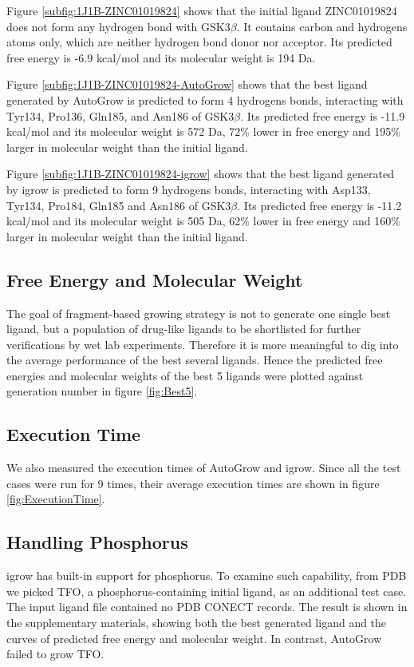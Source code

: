 \documentclass[10pt, conference, compsocconf]{IEEEtran}
\begin{document}
Figure \ref{subfig:1J1B-ZINC01019824} shows that the initial ligand ZINC01019824 does not form any hydrogen bond with GSK3$\beta$. It contains carbon and hydrogens atoms only, which are neither hydrogen bond donor nor acceptor. Its predicted free energy is -6.9 kcal/mol and its molecular weight is 194 Da.

Figure \ref{subfig:1J1B-ZINC01019824-AutoGrow} shows that the best ligand generated by AutoGrow is predicted to form 4 hydrogens bonds, interacting with Tyr134, Pro136, Gln185, and Asn186 of GSK3$\beta$. Its predicted free energy is -11.9 kcal/mol and its molecular weight is 572 Da, 72\% lower in free energy and 195\% larger in molecular weight than the initial ligand.

Figure \ref{subfig:1J1B-ZINC01019824-igrow} shows that the best ligand generated by igrow is predicted to form 9 hydrogens bonds, interacting with Asp133, Tyr134, Pro184, Gln185 and Asn186 of GSK3$\beta$. Its predicted free energy is -11.2 kcal/mol and its molecular weight is 505 Da, 62\% lower in free energy and 160\% larger in molecular weight than the initial ligand.

\subsection{Free Energy and Molecular Weight}

The goal of fragment-based growing strategy is not to generate one single best ligand, but a population of drug-like ligands to be shortlisted for further verifications by wet lab experiments. Therefore it is more meaningful to dig into the average performance of the best several ligands. Hence the predicted free energies and molecular weights of the best 5 ligands were plotted against generation number in figure \ref{fig:Best5}.

\subsection{Execution Time}

We also measured the execution times of AutoGrow and igrow. Since all the test cases were run for 9 times, their average execution times are shown in figure \ref{fig:ExecutionTime}.

\subsection{Handling Phosphorus}

igrow has built-in support for phosphorus. To examine such capability, from PDB we picked TFO, a phosphorus-containing initial ligand, as an additional test case. The input ligand file contained no PDB CONECT records. The result is shown in the supplementary materials, showing both the best generated ligand and the curves of predicted free energy and molecular weight. In contrast, AutoGrow failed to grow TFO.
\end{document}
